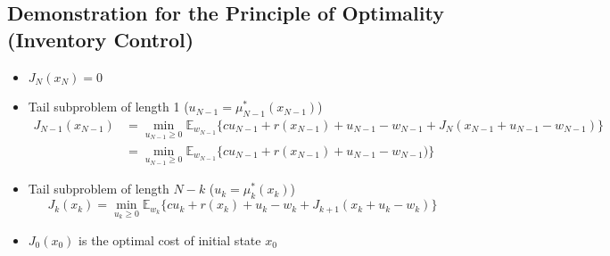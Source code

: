 \subsection{Demonstration for the Principle of Optimality (Inventory Control)}
\begin{itemize}
    \item $J_N(x_N) = 0$
    \item Tail subproblem of length 1 ($u_{N-1}=\mu_{N-1}^*(x_{N-1})$)
    \[
        \begin{array}{ll}
            J_{N-1}(x_{N-1})    &= \min_{u_{N-1}\geq 0} \mathbb{E}_{w_{N-1}}\{ cu_{N-1} + r(x_{N-1}) + u_{N-1} - w_{N-1} + J_N(x_{N-1}+u_{N-1}-w_{N-1}) \} \\
                                &= \min_{u_{N-1}\geq 0} \mathbb{E}_{w_{N-1}}\{ cu_{N-1} + r(x_{N-1}) + u_{N-1} - w_{N-1}) \}
        \end{array}
    \]
    \item Tail subproblem of length $N-k$ ($u_{k}=\mu_{k}^*(x_{k})$)
    \[
        J_{k}(x_{k}) = \min_{u_{k}\geq 0} \mathbb{E}_{w_{k}}\{ cu_{k} + r(x_{k}) + u_{k} - w_{k} + J_{k+1}(x_{k}+u_{k}-w_{k}) \}
    \]
    \item $J_0(x_0)$ is the optimal cost of initial state $x_0$
\end{itemize}

